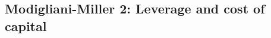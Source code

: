 \documentclass[ieeetran]{article}
\begin{document}
\subsection{Modigliani-Miller 2: Leverage and cost of capital} %
\label{sub:modigliani_miller_2_leverage_and_cost_of_capital}























\end{document}
